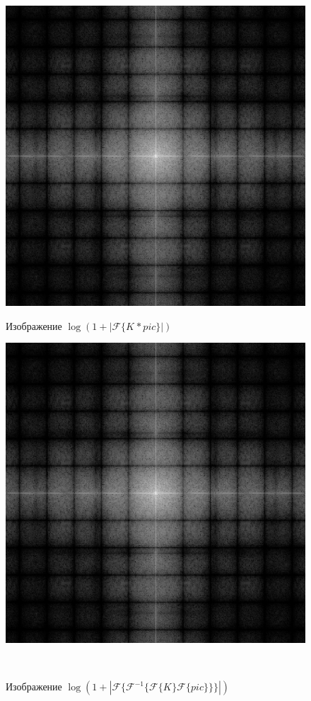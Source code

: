 \documentclass[a4paper]{article}
\begin{document}
\begin{figure}[H]
    \begin{minipage}{0.49\textwidth}
        \centering \includegraphics[width=\textwidth]{2/11_abs_fourier_log_norm_img_block.png}
        \caption{Изображение $\log{(1+|\mathcal{F}\{K_{\boxed{}}*pic\}|)}$}
    \end{minipage}\hfill
    \begin{minipage}{0.49\textwidth}
        \centering \includegraphics[width=\textwidth]{2/11_abs_fourier_log_norm_img_block1.png}
        \caption{Изображение $\log{(1+|\mathcal{F}\{\mathcal{F}^{-1}\{ \mathcal{F}\{K_{\boxed{}}\}\mathcal{F}\{pic\}\}\}|)}$}
    \end{minipage}\\[1em]
\end{figure}\noindent\
\end{document}
